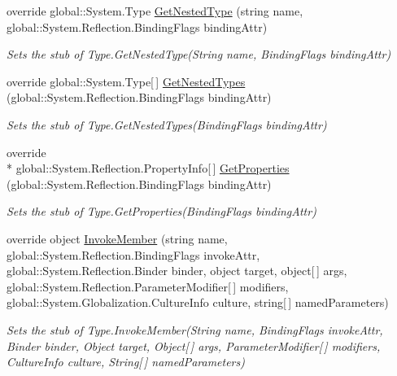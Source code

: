 \begin{DoxyCompactItemize}
override global\-::\-System.\-Type \hyperlink{class_system_1_1_fakes_1_1_stub_type_a779a7144bb6d52ae5cce9c078bbe1f2d}{Get\-Nested\-Type} (string name, global\-::\-System.\-Reflection.\-Binding\-Flags binding\-Attr)
\begin{DoxyCompactList}\small\item\em Sets the stub of Type.\-Get\-Nested\-Type(\-String name, Binding\-Flags binding\-Attr)\end{DoxyCompactList}\item 
override global\-::\-System.\-Type\mbox{[}$\,$\mbox{]} \hyperlink{class_system_1_1_fakes_1_1_stub_type_a428b5046b5391064622b6a0a8c498f44}{Get\-Nested\-Types} (global\-::\-System.\-Reflection.\-Binding\-Flags binding\-Attr)
\begin{DoxyCompactList}\small\item\em Sets the stub of Type.\-Get\-Nested\-Types(\-Binding\-Flags binding\-Attr)\end{DoxyCompactList}\item 
override \\*
global\-::\-System.\-Reflection.\-Property\-Info\mbox{[}$\,$\mbox{]} \hyperlink{class_system_1_1_fakes_1_1_stub_type_af6e5f06a32dfd2111f9eeeddeed01abb}{Get\-Properties} (global\-::\-System.\-Reflection.\-Binding\-Flags binding\-Attr)
\begin{DoxyCompactList}\small\item\em Sets the stub of Type.\-Get\-Properties(\-Binding\-Flags binding\-Attr)\end{DoxyCompactList}\item 
override object \hyperlink{class_system_1_1_fakes_1_1_stub_type_ab1ac5e3e5dfec1e6d7a12658f3bb3ac5}{Invoke\-Member} (string name, global\-::\-System.\-Reflection.\-Binding\-Flags invoke\-Attr, global\-::\-System.\-Reflection.\-Binder binder, object target, object\mbox{[}$\,$\mbox{]} args, global\-::\-System.\-Reflection.\-Parameter\-Modifier\mbox{[}$\,$\mbox{]} modifiers, global\-::\-System.\-Globalization.\-Culture\-Info culture, string\mbox{[}$\,$\mbox{]} named\-Parameters)
\begin{DoxyCompactList}\small\item\em Sets the stub of Type.\-Invoke\-Member(\-String name, Binding\-Flags invoke\-Attr, Binder binder, Object target, Object\mbox{[}$\,$\mbox{]} args, Parameter\-Modifier\mbox{[}$\,$\mbox{]} modifiers, Culture\-Info culture, String\mbox{[}$\,$\mbox{]} named\-Parameters)\end{DoxyCompactList}\item 

\end{DoxyCompactItemize}
